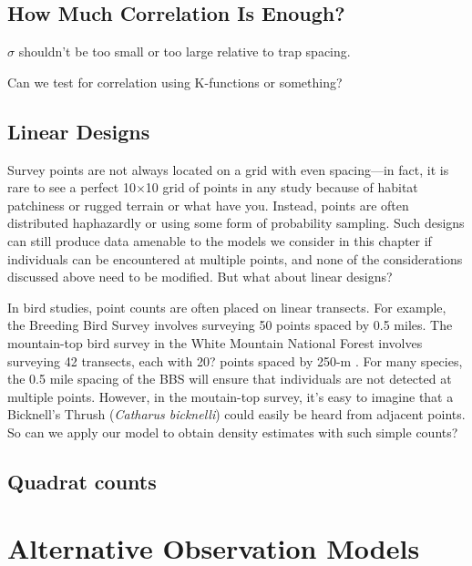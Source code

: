 \subsection{How Much Correlation Is Enough?}

$\sigma$ shouldn't be too small or too large relative to trap spacing.

Can we test for correlation using K-functions or something?

\subsection{Linear Designs}

Survey points are not always located on a grid with even spacing---in
fact, it is rare to see a perfect 10$\times$10 grid of points in any
study because of habitat patchiness or rugged terrain or what have
you. Instead, points are often distributed haphazardly or using some form of
probability sampling. Such designs can still produce data amenable to
the models we consider in this chapter if individuals can be
encountered at multiple points, and none of the considerations
discussed above need to be modified. But what about linear designs?

In bird studies, point counts are often placed on linear transects. For
example, the Breeding Bird Survey involves surveying 50 points spaced
by 0.5 miles. The mountain-top bird survey in the White Mountain
National Forest involves surveying 42 transects, each with 20? points
spaced by 250-m \citep{king_etal:2008}. For many species, the 0.5 mile
spacing of the BBS will ensure that individuals are not detected at
multiple points. However, in the moutain-top survey, it's easy to
imagine that a Bicknell's Thrush (\emph{Catharus bicknelli}) could
easily be heard from adjacent points. So can we apply our model to
obtain density estimates with such simple counts?



\subsection{Quadrat counts}





\section{Alternative Observation Models}
\label{Sect.alt-obsmods}

